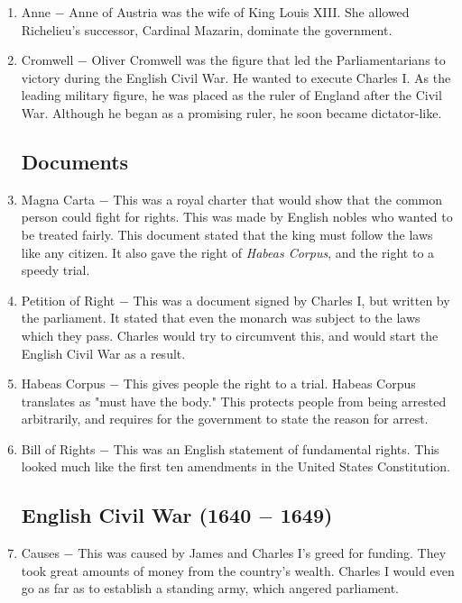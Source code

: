 \documentclass[12pt]{article}
\begin{document}
\begin{enumerate}
\item Anne $-$ Anne of Austria was the wife of King Louis XIII. She allowed Richelieu's successor, Cardinal Mazarin, dominate the government.

\item Cromwell $-$ Oliver Cromwell was the figure that led the Parliamentarians to victory during the English Civil War. He wanted to execute Charles I. As the leading military figure, he was placed as the ruler of England after the Civil War. Although he began as a promising ruler, he soon became dictator-like.

\subsection{Documents}

\item Magna Carta $-$ This was a royal charter that would show that the common person could fight for rights. This was made by English nobles who wanted to be treated fairly. This document stated that the king must follow the laws like any citizen. It also gave the right of \textit{Habeas Corpus}, and the right to a speedy trial.

\item Petition of Right $-$ This was a document signed by Charles I, but written by the parliament. It stated that even the monarch was subject to the laws which they pass. Charles would try to circumvent this, and would start the English Civil War as a result.

\item Habeas Corpus $-$ This gives people the right to a trial. Habeas Corpus translates as "must have the body." This protects people from being arrested arbitrarily, and requires for the government to state the reason for arrest.

\item Bill of Rights $-$ This was an English statement of fundamental rights. This looked much like the first ten amendments in the United States Constitution.

\subsection{English Civil War (1640 $-$ 1649)}

\item Causes $-$ This was caused by James and Charles I's greed for funding. They took great amounts of money from the country's wealth. Charles I would even go as far as to establish a standing army, which angered parliament. 


\end{enumerate}
\end{document}
